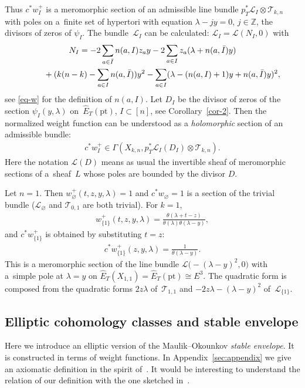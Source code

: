 \documentclass[10pt,a4paper]{amsart}
\numberwithin{equation}{section}
\begin{document}
Thus $c ^*w_I^+$ is a meromorphic section of an admissible line bundle $p_T^*\mathcal L_I\otimes \mathcal T_{k,n}$ with poles on a~finite set of hypertori with equation $\lambda-jy=0$, $j\in\mathbb Z$, the divisors of zeros of $\psi_I$. The bundle~$\mathcal L_I$ can be calculated: $\mathcal L_I=\mathcal L(N_I,0)$ with
\begin{gather}
 N_I=-2\sum_{a\in\bar I}n(a,I)z_ay-2\sum_{a\in I}z_a(\lambda+n(a,\bar I)y)\nonumber\\
\hphantom{N_I=}{} +(k(n-k)-\sum_{a\in I}n(a,\bar I))y^2-\sum_{a\in I}(\lambda- (n(a,I)+1)y+n(a,\bar I)y)^2,\label{e-NI}
\end{gather}
see \eqref{eq-w} for the definition of $n(a,I)$. Let $D_I$ be the divisor of zeros of the section $\psi_I(y,\lambda)$ on~$\hat E_T(\mathrm{pt})$, $I\subset [n]$, see Corollary~\ref{cor-2}. Then the normalized weight function can be understood as a {\em holomorphic} section of an admissible bundle:
\begin{gather*}
c ^*w^+_I\in\Gamma(X_{k,n}, p_T^*\mathcal L_I(D_I)\otimes\mathcal T_{k,n}).
\end{gather*}
Here the notation $\mathcal L(D)$ means as usual the invertible sheaf of meromorphic sections of a~sheaf~$L$ whose poles are bounded by the divisor $D$.
\begin{Example} Let $n=1$. Then $w^+_\varnothing(t,z,y,\lambda)=1$ and $c ^*w_\varnothing=1$ is a section of the trivial bundle ($\mathcal L_{\varnothing}$ and $\mathcal T_{0,1}$ are both trivial). For $k=1$,
\begin{gather*}
w^+_{\{1\}}(t,z,y,\lambda)=\frac{\theta(\lambda+t-z)}{\theta(\lambda)\theta(\lambda-y)},
\end{gather*}
and $c ^*w^+_{\{1\}}$ is obtained by substituting $t=z$:
\begin{gather*}
c ^*w^+_{\{1\}}(z,y,\lambda)=\frac1{\theta(\lambda-y)}.
\end{gather*}
This is a meromorphic section of the line bundle $\mathcal L\big({-}(\lambda-y)^2,0\big)$ with a~simple pole at $\lambda=y$ on $\hat E_T(X_{1,1})=\hat E_T(\mathrm{pt})\cong E^3$. The quadratic form is composed from the quadratic forms $2z\lambda$ of~$\mathcal T_{1,1}$ and $\mathcal -2z\lambda-(\lambda-y)^2$ of~$\mathcal L_{\{1\}}$.
\end{Example}
\subsection{Elliptic cohomology classes and stable envelope}\label{ss-5.5}
Here we introduce an elliptic version of the Maulik--Okounkov {\em stable envelope}. It is constructed in terms of weight functions. In Appendix~\ref{sec:appendix} we give an axiomatic definition in the spirit of~\cite{MO}. It would be interesting to understand the relation of our definition with the one sketched in~\cite{AO}.
\end{document}
